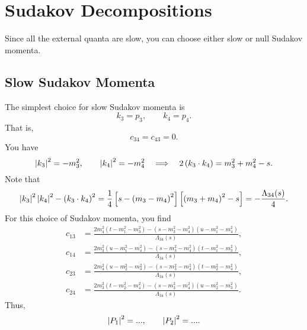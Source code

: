 \section{Sudakov Decompositions}
Since all the external quanta are slow, you can choose either slow or null Sudakov momenta.
\subsection{Slow Sudakov Momenta}
The simplest choice for slow Sudakov momenta is
\begin{equation}
	k_{3} = p_{3}, \qquad k_{4} = p_{4}.
\end{equation}
That is,
\begin{equation}
	c_{34} = c_{43} = 0.
\end{equation}
You have
\begin{equation}
	\left\lvert k_{3} \right\rvert^{2} = -m_{3}^{2}, \qquad \left\lvert k_{4} \right\rvert^{2} = -m_{4}^{2} \quad \Longrightarrow \quad 2\left( k_{3} \cdot k_{4} \right) = m_{3}^{2} + m_{4}^{2} - s.
\end{equation}
Note that
\begin{equation}
	\left\lvert k_{3} \right\rvert^{2} \left\lvert k_{4} \right\rvert^{2} - \left( k_{3} \cdot k_{4} \right)^{2} = \frac{1}{4} \left[ s - \left( m_{3} - m_{4} \right)^{2} \right] \left[ \left( m_{3} + m_{4} \right)^{2} - s \right] = - \frac{\Lambda_{34}(s)}{4}.
\end{equation}
For this choice of Sudakov momenta, you find
\begin{align}
	c_{13} &= \frac{2 m_{4}^{2} \left(t - m_{1}^{2} - m_{3}^{2} \right) - \left(s - m_{3}^{2} - m_{4}^{2} \right) \left(u - m_{1}^{2} - m_{4}^{2} \right) }{\Lambda_{34}(s)}, \\
	c_{14} &= \frac{2 m_{3}^{2} \left(u - m_{1}^{2} - m_{4}^{2} \right) - \left(s - m_{3}^{2} - m_{4}^{2} \right) \left(t - m_{1}^{2} - m_{3}^{2} \right) }{\Lambda_{34}(s)}, \\
	c_{23} &= \frac{2 m_{4}^{2} \left(u - m_{2}^{2} - m_{3}^{2} \right) - \left(s - m_{3}^{2} - m_{4}^{2} \right) \left(t - m_{2}^{2} - m_{4}^{2} \right) }{\Lambda_{34}(s)}, \\
	c_{24} &= \frac{2 m_{3}^{2} \left(t - m_{2}^{2} - m_{4}^{2} \right) - \left(s - m_{3}^{2} - m_{4}^{2} \right) \left(u - m_{2}^{2} - m_{3}^{2} \right) }{\Lambda_{34}(s)}.
\end{align}
Thus,
\begin{equation}
	\left\lvert P_{1} \right\rvert^{2} = ..., \qquad \left\lvert P_{2} \right\rvert^{2} = ....
\end{equation}
